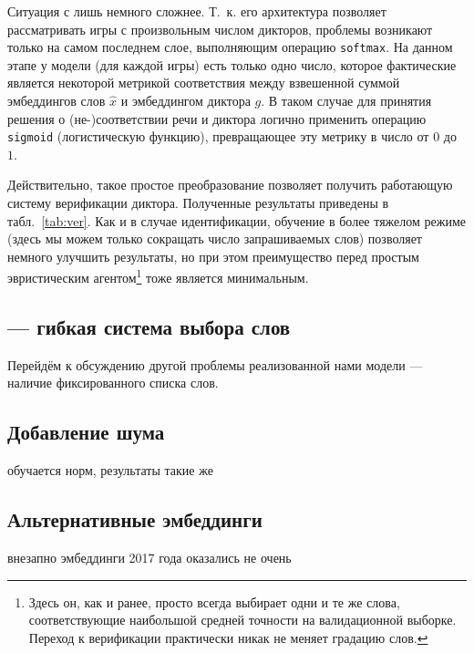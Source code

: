Ситуация с \guesser{} лишь немного сложнее. Т.~к. его архитектура позволяет
рассматривать игры с произвольным числом дикторов, проблемы возникают только на
самом последнем слое, выполняющим операцию \texttt{softmax}. На данном этапе у
модели (для каждой игры) есть только одно число, которое фактические является
некоторой метрикой соответствия между взвешенной суммой эмбеддингов слов $\hat{x}$
и эмбеддингом диктора $g$. В таком случае для принятия решения о (не-)соответствии
речи и диктора логично применить операцию \texttt{sigmoid} (логистическую функцию),
превращающее эту метрику в число от $0$ до $1$.

Действительно, такое простое преобразование позволяет получить работающую
систему верификации диктора. Полученные результаты приведены в
табл.~\ref{tab:ver}. Как и в случае идентификации, обучение в более тяжелом
режиме (здесь мы можем только сокращать число запрашиваемых слов) позволяет
немного улучшить результаты, но при этом преимущество перед простым эвристическим
агентом\footnote{
    Здесь он, как и ранее, просто всегда выбирает одни и те же слова,
    соответствующие наибольшой средней точности на валидационной выборке.
    Переход к верификации практически никак не меняет градацию слов.
} тоже является минимальным.

\subsection{\cbenquirer{} --- гибкая система выбора слов}

Перейдём к обсуждению другой проблемы реализованной нами модели --- наличие
фиксированного списка слов.

\subsection{Добавление шума}
обучается норм, результаты такие же

\subsection{Альтернативные эмбеддинги}\label{ssec:cpc}
внезапно эмбеддинги 2017 года оказались не очень

